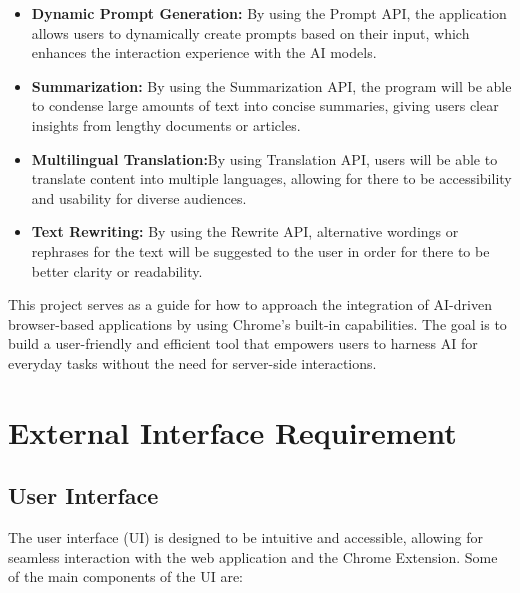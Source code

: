 \documentclass{article}
\begin{document}
\begin{itemize}
    \item \textbf{Dynamic Prompt Generation:} By using the Prompt API, the application allows users to dynamically create prompts based on their input, which enhances the interaction experience with the AI models.
    \item \textbf{Summarization:} By using the Summarization API, the program will be able to condense large amounts of text into concise summaries, giving users clear insights from lengthy documents or articles.
    \item \textbf{Multilingual Translation:}By using Translation API, users will be able to translate content into multiple languages, allowing for there to be accessibility and usability for diverse audiences.
    \item \textbf{Text Rewriting:} By using the Rewrite API, alternative wordings or rephrases for the text will be suggested to the user in order for there to be better clarity or readability.
\end{itemize}

This project serves as a guide for how to approach the integration of AI-driven browser-based applications by using Chrome’s built-in capabilities. The goal is to build a user-friendly and efficient tool that empowers users to harness AI for everyday tasks without the need for server-side interactions.

\section{External Interface Requirement}
\subsection{User Interface}
The user interface (UI) is designed to be intuitive and accessible, allowing for seamless interaction with the web application and the Chrome Extension. Some of the main components of the UI are:
\end{document}

